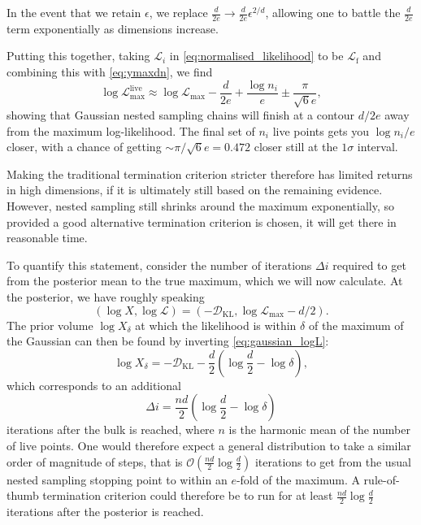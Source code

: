 \documentclass[usenatbib]{mnras}
\newcommand{\Like}{\mathcal{L}}
\newcommand{\DKL}{\mathcal{D}_\mathrm{KL}}
\newcommand{\logLmax}{\log \Like_\mathrm{max}}
\begin{document}
In the event that we retain $\epsilon$, we replace $\frac{d}{2e}\to \frac{d}{2e}\epsilon^{2/d}$, allowing one to battle the $\frac{d}{2e}$ term exponentially as dimensions increase.
\par
Putting this together, taking $\mathcal{L}_i$ in \cref{eq:normalised_likelihood} to be $\mathcal{L}_\mathrm{f}$ and combining this with \cref{eq:ymaxdn}, we find
\begin{equation}
    \boxed{
        \log{\mathcal{L}}_\mathrm{max}^\mathrm{live} \approx \log\mathcal{L}_\mathrm{max} - \frac{d}{2e} + \frac{\log n_i}{e} \pm \frac{\pi}{\sqrt{6}e}
    },
\end{equation}
showing that Gaussian nested sampling chains will finish at a contour $d/2e$ away from the maximum log-likelihood. The final set of $n_i$ live points gets you $\log n_i/e$ closer, with a chance of getting $\sim\pi/\sqrt{6}e=0.472$ closer still at the $1\sigma$ interval. 
\par
Making the traditional termination criterion stricter therefore has limited returns in high dimensions, if it is ultimately still based on the remaining evidence. However, nested sampling still shrinks around the maximum exponentially, so provided a good alternative termination criterion is chosen, it will get there in reasonable time. 
\par
To quantify this statement, consider the number of iterations $\Delta i$ required to get from the posterior mean to the true maximum, which we will now calculate. At the posterior, we have roughly speaking
\begin{equation}
    (\log X, \log\Like) = (-\DKL, \logLmax - d/2).
\end{equation}
The prior volume $\log X_\delta$ at which the likelihood is within $\delta$ of the maximum of the Gaussian can then be found by inverting \cref{eq:gaussian_logL}:
\begin{equation}
    \log X_\delta = -\DKL - \frac{d}{2} \left(\log \frac{d}{2} - \log \delta\right),
\end{equation}
which corresponds to an additional
\begin{equation}\label{eq:delta_i_pd}
    \Delta i = \frac{nd}{2} \left(\log \frac{d}{2} - \log \delta\right)
\end{equation}
iterations after the bulk is reached, where $n$ is the harmonic mean of the number of live points. One would therefore expect a general distribution to take a similar order of magnitude of steps, that is $\mathcal{O}(\tfrac{n d }{2}\log \tfrac{d}{2})$ iterations to get from the usual nested sampling stopping point to within an $e$-fold of the maximum. A rule-of-thumb termination criterion could therefore be to run for at least $\tfrac{nd}{2}\log\tfrac{d}{2}$ iterations after the posterior is reached.
\end{document}
